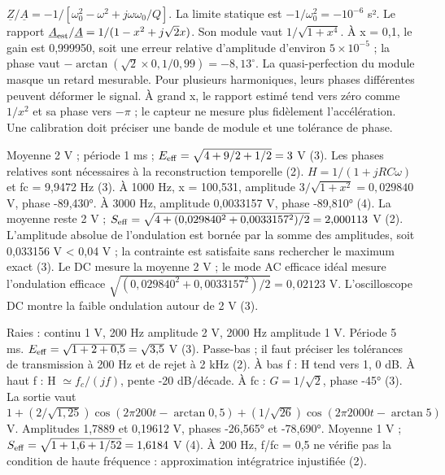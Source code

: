 $\underline Z/\underline A=-1/[\omega_0^2-\omega^2+j\omega\omega_0/Q]$. La limite statique est $-1/\omega_0^2=-10^{-6}$ s². Le rapport $\underline A_{\rm est}/\underline A=1/(1-x^2+j\sqrt2x)$. Son module vaut $1/\sqrt{1+x^4}$. À x = 0,1, le gain est 0,999950, soit une erreur relative d’amplitude d’environ $5\times10^{-5}$ ; la phase vaut $-\arctan(\sqrt2\times0{,}1/0{,}99)=-8{,}13^\circ$. La quasi-perfection du module masque un retard mesurable. Pour plusieurs harmoniques, leurs phases différentes peuvent déformer le signal. À grand x, le rapport estimé tend vers zéro comme $1/x^2$ et sa phase vers $-\pi$ ; le capteur ne mesure plus fidèlement l’accélération. Une calibration doit préciser une bande de module et une tolérance de phase.

Moyenne 2 V ; période 1 ms ; $E_{\rm eff}=\sqrt{4+9/2+1/2}=3$ V (3). Les phases relatives sont nécessaires à la reconstruction temporelle (2).
$H=1/(1+jRC\omega)$ et fc = 9,9472 Hz (3). À 1000 Hz, x = 100,531, amplitude $3/\sqrt{1+x^2}=0{,}029840$ V, phase -89,430°. À 3000 Hz, amplitude 0,0033157 V, phase -89,810° (4). La moyenne reste 2 V ; $S_{\rm eff}=\sqrt{4+(0{,}029840^2+0{,}0033157^2)/2}=2{,}000113$ V (2).
L’amplitude absolue de l’ondulation est bornée par la somme des amplitudes, soit 0,033156 V < 0,04 V ; la contrainte est satisfaite sans rechercher le maximum exact (3). Le DC mesure la moyenne 2 V ; le mode AC efficace idéal mesure l’ondulation efficace $\sqrt{(0{,}029840^2+0{,}0033157^2)/2}=0{,}02123$ V. L’oscilloscope DC montre la faible ondulation autour de 2 V (3).


Raies : continu 1 V, 200 Hz amplitude 2 V, 2000 Hz amplitude 1 V. Période 5 ms. $E_{\rm eff}=\sqrt{1+2+0{,}5}=\sqrt{3{,}5}$ V (3). Passe-bas ; il faut préciser les tolérances de transmission à 200 Hz et de rejet à 2 kHz (2).
À bas f : H tend vers 1, 0 dB. À haut f : H $\simeq f_c/(jf)$, pente -20 dB/décade. À fc : $G=1/\sqrt2$, phase -45° (3). La sortie vaut $1+(2/\sqrt{1{,}25})\cos(2\pi200t-\arctan0{,}5)+(1/\sqrt{26})\cos(2\pi2000t-\arctan5)$ V. Amplitudes 1,7889 et 0,19612 V, phases -26,565° et -78,690°. Moyenne 1 V ; $S_{\rm eff}=\sqrt{1+1{,}6+1/52}=1{,}6184$ V (4). À 200 Hz, f/fc = 0,5 ne vérifie pas la condition de haute fréquence : approximation intégratrice injustifiée (2).


